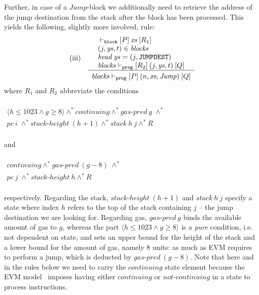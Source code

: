 \documentclass[sigplan,10pt,review]{acmart}\settopmatter{printfolios=true,printccs=false,printacmref=false}
\newcommand{\sconj}{\wedge^*}
\newcommand{\ttrip}[5]{\mathit{#1} \vdash_{\mathrm{#2}}[#3]\:#4\:[#5]}
\newcommand{\cont}{\mathit{continuing}}
\newcommand{\ncont}{\mathit{not\mbox{-}continuing}}
\newcommand{\pc}{\mathit{pc}}
\newcommand{\gaspred}{\mathit{gas\mbox{-}pred}}
\newcommand{\stackh}{\mathit{stack\mbox{-}height}}
\newcommand{\stack}{\mathit{stack}}
\newcommand{\instr}[1]{\mathtt{#1}}
\newcommand{\pure}[1]{\langle#1\rangle}
\newcommand{\hd}{\mathit{head}\:}
\newcommand{\RuleC}[2]{\begin{array}{c}#1\\\hline\noalign{\smallskip}#2\end{array}}
\begin{document}
Further, in case of a $\mathit{Jump}$-block we additionally need to retrieve the address of the jump 
destination from the stack 
after the block has been processed. This yields the following, slightly more involved, rule:
\[
\begin{array}{l l}
\mbox{(iii)} & \RuleC{\begin{array}{l}\ttrip{}{\mathtt{block}}{P}{\mathit{xs}}{R_1} \\
                                      (j, \mathit{ys},t) \in \mathit{blocks} \\
                                      \hd\mathit{ys} = (j, \instr{JUMPDEST}) \\
                                      \ttrip{\mathit{blocks}}{\mathtt{prog}}{R_2}{(j, \mathit{ys},t)}{Q}
                      \end{array}}
     {\ttrip{\mathit{blocks}}{\mathtt{prog}}{P}{(n, \mathit{xs}, \mathit{Jump})}{Q}}
\end{array}
\]
where $R_1$ and $R_2$ abbreviate the conditions \\
\\$
\begin{array}{l}
\pure{h \le 1023 \wedge g \geq 8} \sconj \cont \sconj \gaspred\:g \; \sconj \\
\pc\:i \; \sconj \stackh\:(h + 1) \sconj \stack\:h\:j \sconj R 
\end{array}
$\\ 
\\
and\\
\\$
\begin{array}{l}
\cont \sconj \gaspred\:(g - 8) \; \sconj \\
\pc\:j \; \sconj \stackh\:h \sconj R 
\end{array}
$\\
\\respectively. 
Regarding the stack, $\stackh\:(h + 1)$ and $\stack\:h\:j$ specify a state where
index $h$ refers to the top of the stack containing $j$ -- the jump destination we are looking for. 
Regarding gas, $\gaspred\:g$
binds the available amount of gas to $g$, whereas 
the part $\pure{h \le 1023 \wedge g \geq 8}$ is a \emph{pure} condition,
i.e. not dependent on state, and sets an upper bound for the height of
the stack and a lower bound for the amount of gas, namely $8$ units: 
as much as EVM requires to perform a jump, which is deducted by $\gaspred\:(g - 8)$.   
Note that here and in the rules below we need to carry the $\cont$ state element because the EVM model~\cite{Yoichi}
imposes having either $\cont$ or $\ncont$ in a state to process instructions.
\end{document}
